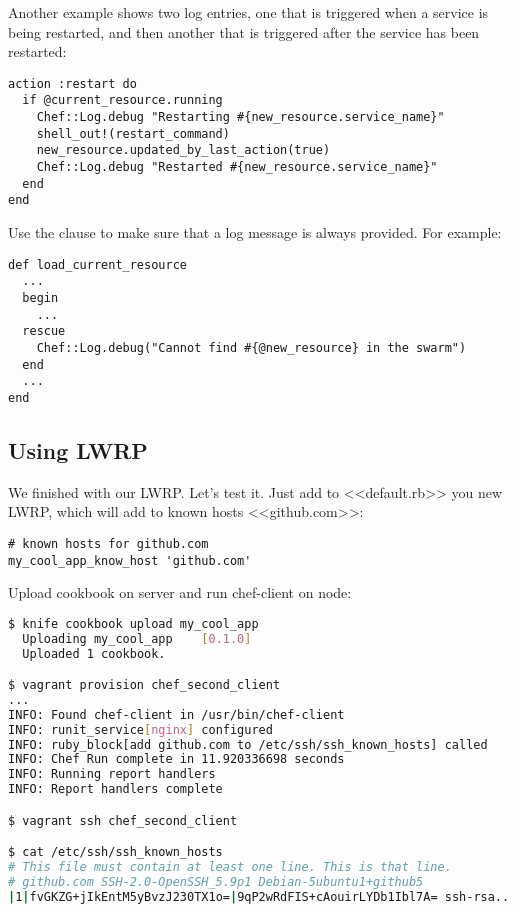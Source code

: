 Another example shows two log entries, one that is triggered when a service is being restarted, and then another that is triggered after the service has been restarted:

\begin{lstlisting}[label=lst:cookbook-lwrp-logs3]
action :restart do
  if @current_resource.running
    Chef::Log.debug "Restarting #{new_resource.service_name}"
    shell_out!(restart_command)
    new_resource.updated_by_last_action(true)
    Chef::Log.debug "Restarted #{new_resource.service_name}"
  end
end
\end{lstlisting}

Use the  clause to make sure that a log message is always provided. For example:

\begin{lstlisting}[label=lst:cookbook-lwrp-logs4]
def load_current_resource
  ...
  begin
    ...
  rescue
    Chef::Log.debug("Cannot find #{@new_resource} in the swarm")
  end
  ...
end
\end{lstlisting}

\subsection{Using LWRP}

We finished with our LWRP. Let's test it. Just add to <<default.rb>> you new LWRP, which will add to known hosts <<github.com>>:

\begin{lstlisting}[label=lst:cookbook-lwrp5,title=my-server-cloud/site-cookbooks/my\_cool\_app/recipes/default.rb]
# known hosts for github.com
my_cool_app_know_host 'github.com'
\end{lstlisting}

Upload cookbook on server and run chef-client on node:

\begin{lstlisting}[language=Bash,label=lst:cookbook-lwrp6]
$ knife cookbook upload my_cool_app
  Uploading my_cool_app    [0.1.0]
  Uploaded 1 cookbook.

$ vagrant provision chef_second_client
...
INFO: Found chef-client in /usr/bin/chef-client
INFO: runit_service[nginx] configured
INFO: ruby_block[add github.com to /etc/ssh/ssh_known_hosts] called
INFO: Chef Run complete in 11.920336698 seconds
INFO: Running report handlers
INFO: Report handlers complete

$ vagrant ssh chef_second_client

$ cat /etc/ssh/ssh_known_hosts
# This file must contain at least one line. This is that line.
# github.com SSH-2.0-OpenSSH_5.9p1 Debian-5ubuntu1+github5
|1|fvGKZG+jIkEntM5yBvzJ230TX1o=|9qP2wRdFIS+cAouirLYDb1Ibl7A= ssh-rsa...
\end{lstlisting}

